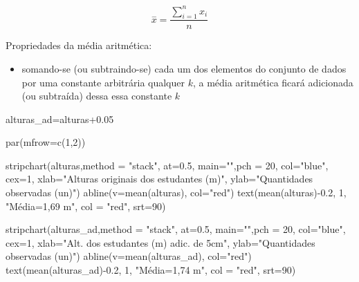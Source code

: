 \documentclass[
]{book}
\newenvironment{Shaded}{\begin{snugshade}}{\end{snugshade}}
\newcommand{\AttributeTok}[1]{\textcolor[rgb]{0.77,0.63,0.00}{#1}}
\newcommand{\DecValTok}[1]{\textcolor[rgb]{0.00,0.00,0.81}{#1}}
\newcommand{\FloatTok}[1]{\textcolor[rgb]{0.00,0.00,0.81}{#1}}
\newcommand{\FunctionTok}[1]{\textcolor[rgb]{0.00,0.00,0.00}{#1}}
\newcommand{\NormalTok}[1]{#1}
\newcommand{\OtherTok}[1]{\textcolor[rgb]{0.56,0.35,0.01}{#1}}
\newcommand{\SpecialCharTok}[1]{\textcolor[rgb]{0.00,0.00,0.00}{#1}}
\newcommand{\StringTok}[1]{\textcolor[rgb]{0.31,0.60,0.02}{#1}}
\providecommand{\tightlist}{%
  \setlength{\itemsep}{0pt}\setlength{\parskip}{0pt}}
\begin{document}
\[
\stackrel{-}{x}=\frac{\sum _{i=1}^{n}{x}_{i}}{n}
\]

Propriedades da média aritmética:

\begin{itemize}
\tightlist
\item
  somando-se (ou subtraindo-se) cada um dos elementos do conjunto de dados por uma constante arbitrária qualquer \(k\), a média aritmética ficará adicionada (ou subtraída) dessa essa constante \(k\)
\end{itemize}

\begin{Shaded}
\begin{Highlighting}[]
\NormalTok{alturas\_ad}\OtherTok{=}\NormalTok{alturas}\FloatTok{+0.05}

\FunctionTok{par}\NormalTok{(}\AttributeTok{mfrow=}\FunctionTok{c}\NormalTok{(}\DecValTok{1}\NormalTok{,}\DecValTok{2}\NormalTok{))}

\FunctionTok{stripchart}\NormalTok{(alturas,}\AttributeTok{method =} \StringTok{"stack"}\NormalTok{,  }\AttributeTok{at=}\FloatTok{0.5}\NormalTok{, }
\AttributeTok{main=}\StringTok{""}\NormalTok{,}\AttributeTok{pch =} \DecValTok{20}\NormalTok{,}
\AttributeTok{col=}\StringTok{"blue"}\NormalTok{, }\AttributeTok{cex=}\DecValTok{1}\NormalTok{, }\AttributeTok{xlab=}\StringTok{"Alturas originais dos estudantes (m)"}\NormalTok{, }
\AttributeTok{ylab=}\StringTok{"Quantidades observadas (un)"}\NormalTok{)}
\FunctionTok{abline}\NormalTok{(}\AttributeTok{v=}\FunctionTok{mean}\NormalTok{(alturas), }\AttributeTok{col=}\StringTok{"red"}\NormalTok{) }
\FunctionTok{text}\NormalTok{(}\FunctionTok{mean}\NormalTok{(alturas)}\SpecialCharTok{{-}}\FloatTok{0.2}\NormalTok{, }\DecValTok{1}\NormalTok{, }\StringTok{"Média=1,69 m"}\NormalTok{, }\AttributeTok{col =} \StringTok{"red"}\NormalTok{, }\AttributeTok{srt=}\DecValTok{90}\NormalTok{) }

\FunctionTok{stripchart}\NormalTok{(alturas\_ad,}\AttributeTok{method =} \StringTok{"stack"}\NormalTok{,  }\AttributeTok{at=}\FloatTok{0.5}\NormalTok{, }
\AttributeTok{main=}\StringTok{""}\NormalTok{,}\AttributeTok{pch =} \DecValTok{20}\NormalTok{,}
\AttributeTok{col=}\StringTok{"blue"}\NormalTok{, }\AttributeTok{cex=}\DecValTok{1}\NormalTok{, }\AttributeTok{xlab=}\StringTok{"Alt. dos estudantes (m) adic. de 5cm"}\NormalTok{, }
\AttributeTok{ylab=}\StringTok{"Quantidades observadas (un)"}\NormalTok{)}
\FunctionTok{abline}\NormalTok{(}\AttributeTok{v=}\FunctionTok{mean}\NormalTok{(alturas\_ad), }\AttributeTok{col=}\StringTok{"red"}\NormalTok{) }
\FunctionTok{text}\NormalTok{(}\FunctionTok{mean}\NormalTok{(alturas\_ad)}\SpecialCharTok{{-}}\FloatTok{0.2}\NormalTok{, }\DecValTok{1}\NormalTok{, }\StringTok{"Média=1,74 m"}\NormalTok{, }\AttributeTok{col =} \StringTok{"red"}\NormalTok{, }\AttributeTok{srt=}\DecValTok{90}\NormalTok{) }
\end{Highlighting}
\end{Shaded}
\end{document}
